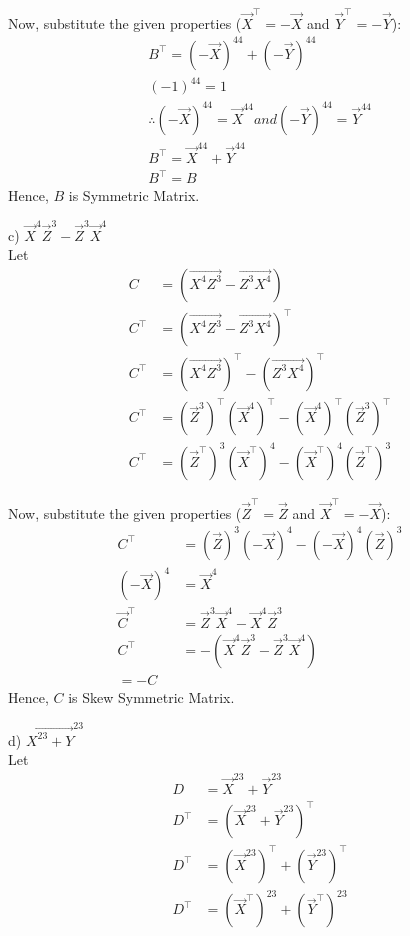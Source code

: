 \documentclass{beamer}
\begin{document}
\begin{frame}
Now, substitute the given properties ($\vec{X}^\top = -\vec{X}$ and $\vec{Y}^\top = -\vec{Y}$):
\begin{align}
B^\top = (-\vec{X})^{44} + (-\vec{Y})^{44}\\
(-1)^{44} = 1 \\
\therefore (-\vec{X})^{44} = \vec{X}^{44} and (-\vec{Y})^{44} = \vec{Y}^{44} \\
B^\top = \vec{X}^{44} + \vec{Y}^{44}\\
B^\top=B
\end{align}
Hence, $B$ is Symmetric Matrix.
\end{frame}
\begin{frame}
c)  $\vec{X}^4\vec{Z}^3 - \vec{Z}^3\vec{X}^4$\\Let
\begin{align}
C&=(\vec{X^4Z^3} - \vec{Z^3X^4})\\
C^\top &= (\vec{X^4Z^3} - \vec{Z^3X^4})^\top \\
C^\top &= (\vec{X^4Z^3})^\top - (\vec{Z^3X^4})^\top \\
C^\top &= (\vec{Z}^3)^\top(\vec{X}^4)^\top - (\vec{X}^4)^\top(\vec{Z}^3)^\top \\
C^\top &= (\vec{Z}^\top)^3(\vec{X}^\top)^4 - (\vec{X}^\top)^4(\vec{Z}^\top)^3
\end{align}
\end{frame}
\begin{frame}
Now, substitute the given properties ($\vec{Z}^\top = \vec{Z}$ and $\vec{X}^\top = -\vec{X}$):
\begin{align}
C^\top&= (\vec{Z})^3(-\vec{X})^4 - (-\vec{X})^4(\vec{Z})^3 \\
(-\vec{X})^4 &= \vec{X}^4 \\
\vec{C}^\top &= \vec{Z}^3\vec{X}^4 - \vec{X}^4\vec{Z}^3 \\
C^\top &= -(\vec{X}^4\vec{Z}^3 - \vec{Z}^3\vec{X}^4)\\
=-C
\end{align}
Hence, $C$ is Skew Symmetric Matrix.
\end{frame}
\begin{frame}
d) $\vec{X^{23} + Y}^{23}$\\Let
\begin{align}
D&=\vec{X}^{23} + \vec{Y}^{23}\\
D^\top &= (\vec{X}^{23} + \vec{Y}^{23})^\top \\
D^\top &= (\vec{X}^{23})^\top + (\vec{Y}^{23})^\top \\
D^\top &= (\vec{X}^\top)^{23} + (\vec{Y}^\top)^{23}
\end{align}
\end{frame}
\end{document}
